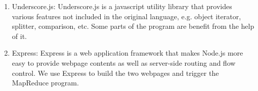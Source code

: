 \begin{enumerate}
\item Underscore.js\cite{underscorejs}:
  Underscore.js is a javascript utility library that provides various features not included in the original language, e.g. object iterator, splitter, comparison, etc. Some parts of the program are benefit from the help of it.

\item Express\cite{express}:
  Express is a web application framework that makes Node.js more easy to provide webpage contents as well as server-side routing and flow control. We use Express to build the two webpages and trigger the MapReduce program.

\end{enumerate}
